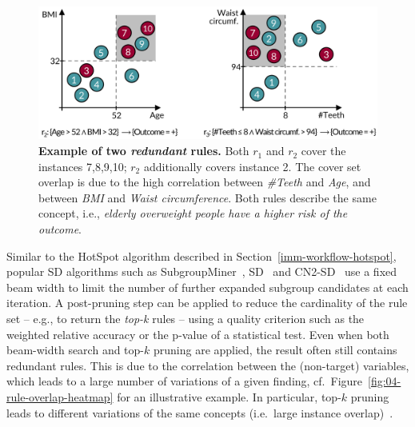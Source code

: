 \documentclass[
  oneside]{book}
\begin{document}
\begin{figure}[h]

{\centering \includegraphics[width=0.8\linewidth]{figures/04-rule-redundancy} 

}

\caption{\textbf{Example of two \emph{redundant} rules.} Both \(r_1\) and \(r_2\) cover the instances 7,8,9,10; \(r_2\) additionally covers instance 2. The cover set overlap is due to the high correlation between \emph{\#Teeth} and \emph{Age}, and between \emph{BMI} and \emph{Waist circumference}. Both rules describe the same concept, i.e., \emph{elderly overweight people have a higher risk of the outcome}.}\label{fig:04-rule-redundancy}
\end{figure}

Similar to the HotSpot algorithm described in Section~\ref{imm-workflow-hotspot}, popular SD algorithms such as SubgroupMiner~\autocite{Kloesgen:SubgroupMiner2002},
SD~\autocite{Gamberger:SD02} and CN2-SD~\autocite{Lavravc:CN2-SD04} use a fixed beam width to limit the number of further expanded subgroup candidates at each iteration.
A post-pruning step can be applied to reduce the cardinality of the rule set -- e.g., to return the \emph{top-k} rules -- using a quality criterion such as the weighted relative accuracy or the p-value of a statistical test.
Even when both beam-width search and top-\(k\) pruning are applied, the result often still contains redundant rules.
This is due to the correlation between the (non-target) variables, which leads to a large number of variations of a given finding, cf.~Figure~\ref{fig:04-rule-overlap-heatmap} for an illustrative example.
In particular, top-\(k\) pruning leads to different variations of the same concepts (i.e.~large instance overlap)~\autocite{VanLeeuwen:DSSD12}.
\end{document}
